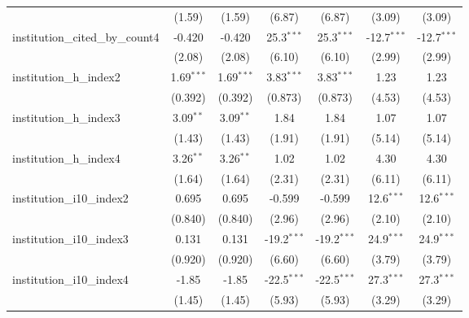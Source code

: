 \begin{tabular}{lcccccc}
                                         & (1.59)        & (1.59)        & (6.87)        & (6.87)        & (3.09)        & (3.09)\\   
   institution\_cited\_by\_count4        & -0.420        & -0.420        & 25.3$^{***}$  & 25.3$^{***}$  & -12.7$^{***}$ & -12.7$^{***}$\\   
                                         & (2.08)        & (2.08)        & (6.10)        & (6.10)        & (2.99)        & (2.99)\\   
   institution\_h\_index2                & 1.69$^{***}$  & 1.69$^{***}$  & 3.83$^{***}$  & 3.83$^{***}$  & 1.23          & 1.23\\   
                                         & (0.392)       & (0.392)       & (0.873)       & (0.873)       & (4.53)        & (4.53)\\   
   institution\_h\_index3                & 3.09$^{**}$   & 3.09$^{**}$   & 1.84          & 1.84          & 1.07          & 1.07\\   
                                         & (1.43)        & (1.43)        & (1.91)        & (1.91)        & (5.14)        & (5.14)\\   
   institution\_h\_index4                & 3.26$^{**}$   & 3.26$^{**}$   & 1.02          & 1.02          & 4.30          & 4.30\\   
                                         & (1.64)        & (1.64)        & (2.31)        & (2.31)        & (6.11)        & (6.11)\\   
   institution\_i10\_index2              & 0.695         & 0.695         & -0.599        & -0.599        & 12.6$^{***}$  & 12.6$^{***}$\\   
                                         & (0.840)       & (0.840)       & (2.96)        & (2.96)        & (2.10)        & (2.10)\\   
   institution\_i10\_index3              & 0.131         & 0.131         & -19.2$^{***}$ & -19.2$^{***}$ & 24.9$^{***}$  & 24.9$^{***}$\\   
                                         & (0.920)       & (0.920)       & (6.60)        & (6.60)        & (3.79)        & (3.79)\\   
   institution\_i10\_index4              & -1.85         & -1.85         & -22.5$^{***}$ & -22.5$^{***}$ & 27.3$^{***}$  & 27.3$^{***}$\\   
                                         & (1.45)        & (1.45)        & (5.93)        & (5.93)        & (3.29)        & (3.29)\\   

\end{tabular}

